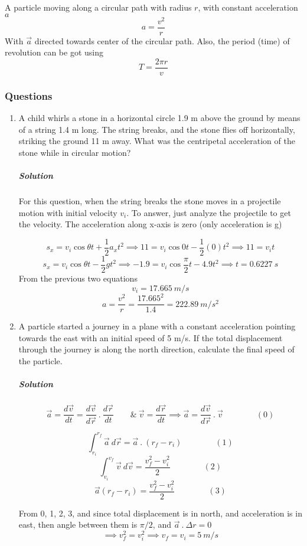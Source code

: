 \documentclass{article}
\begin{document}
A particle moving along a circular path with radius $ r $, with constant acceleration $a $
\[
	a = \frac{v^2}{r}
\]
With $ \vec{ a } $ directed towards center  of the circular path. Also, the period (time) of revolution can be got using 
\[
	T = \frac{ 2 \pi r }{v}
\]

\subsubsection{Questions}
\begin{enumerate}[1.]
	\item A  child  whirls  a  stone  in  a  horizontal  circle 1.9 m above  the  ground  by  means  of  a string 1.4 m long.  The  string  breaks,  and  the  stone  flies  off  horizontally,  striking  the ground 11 m away.  What  was  the  centripetal  acceleration  of  the  stone  while  in  circular motion? 
		\subparagraph{Solution} For this question, when the string breaks the stone moves in a projectile motion with initial velocity $ v_i $. To answer, just analyze the projectile to get the velocity. The acceleration along x-axis is zero (only acceleration is g)

		\[
			s_x = v_i \cos{ \theta }  t+  \frac{1}{2} a_x t^2 \implies 11 = v_i \cos{ 0 } t - \frac{1}{2} (0) t^2 \implies 11 = v_i t
		\]
		\[
			s_x = v_i \cos{ \theta } t - \frac{1}{2} g t^2 \implies -1.9 = v_i \cos{ \frac{\pi}{2} } t - 4.9 t^2 \implies t =  0.6227\ s
		\]
		From the previous two equations
		\[
			v_i = 17.665\ m / s
		\]
		\[
			a = \frac{v^2}{r} = \frac{17.665^2}{1.4} = 222.89\ m / s^2
		\]

	\item A particle started a journey in a plane with a constant acceleration pointing towards the east with an initial speed of 5 m/s. If the total displacement through the journey is along the north direction, calculate the final speed of the particle.
		\subparagraph{Solution}
		\[
			\vec{ a } = \frac{ d \vec{ v } }{ dt } = \frac{ d\vec{ v } }{ d \vec{ r } }\ .\ \frac{ d \vec{ r } }{ dt } \qquad \&\ \vec{ v }= \frac{ d \vec{ r } }{ d t }  \implies \vec{ a } = \frac{ d \vec{ v } }{ d \vec{ r } }\ .\ \vec{ v }   \qquad \qquad  (0)
		\]

		\[
			\int^{r_f}_{r_i} \vec{ a }\ d \vec{ r } = \vec{ a } \ . \   (r_f-r_i) \qquad \qquad (1)
		\]
		\[
			\int^{v_f}_{v_i} \vec{ v }\ d \vec{ v }  =  \frac{v_f^2 - v_i^2 }{2} \qquad \qquad (2)
		\]
		\[
			\vec{ a } (r_f - r_i) =  \frac{v_f^2 - v_i^2 }{2} \qquad  \qquad (3)
		\]


		From 0, 1, 2, 3, and since total displacement is in north, and acceleration is in east, then angle between them is $ \pi /2 $, and $ \vec{ a }\ .\ \varDelta r = 0 $
		\[
			\implies v_f^2 = v_i^2 \implies v_f = v_i = 5\ m / s
		\]


\end{enumerate}
\end{document}
